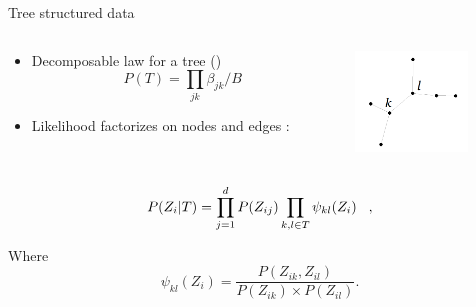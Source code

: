 \documentclass[11pt]{beamer}
\newcommand{\emphase}[1]{\textcolor{Complement}{#1}}
\begin{document}
\begin{frame}{Tree structured data}
\begin{columns}
 \begin{column}{0.7\linewidth}
 \begin{itemize}
    \item Decomposable law for a tree (\cite{kirshner})\\
    $$ P(T) = \prod_{jk} \beta_{jk} / B $$
    \item Likelihood \emphase{factorizes on nodes and edges} \citep{ChowLiu}:
    \end{itemize}
 \end{column}
 \begin{column}{0.3\linewidth}
 \begin{center}
     \includegraphics[width=3cm]{arbredependance.PNG}   
    \end{center}
 \end{column}
\end{columns}

\[P(Z_i|T) =\prod_{j=1}^d P(Z_{ij})\prod_{k,l \in T}\psi_{kl}(Z_i) \hspace{0.3cm},\]

Where \[ \psi_{kl}(Z_i) = \frac{P(Z_{ik},Z_{il})}{P(Z_{ik})\times P(Z_{il})}.\]\\

\end{frame}
\end{document}
